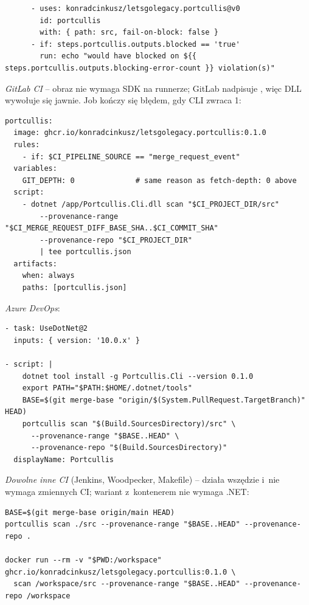 \begin{lstlisting}
      - uses: konradcinkusz/letsgolegacy.portcullis@v0
        id: portcullis
        with: { path: src, fail-on-block: false }
      - if: steps.portcullis.outputs.blocked == 'true'
        run: echo "would have blocked on ${{ steps.portcullis.outputs.blocking-error-count }} violation(s)"
\end{lstlisting}

\emph{GitLab CI} -- obraz nie wymaga SDK na runnerze; GitLab nadpisuje
, więc DLL wywołuje się jawnie. Job kończy się błędem, gdy CLI zwraca 1:

\begin{lstlisting}
portcullis:
  image: ghcr.io/konradcinkusz/letsgolegacy.portcullis:0.1.0
  rules:
    - if: $CI_PIPELINE_SOURCE == "merge_request_event"
  variables:
    GIT_DEPTH: 0              # same reason as fetch-depth: 0 above
  script:
    - dotnet /app/Portcullis.Cli.dll scan "$CI_PROJECT_DIR/src"
        --provenance-range "$CI_MERGE_REQUEST_DIFF_BASE_SHA..$CI_COMMIT_SHA"
        --provenance-repo "$CI_PROJECT_DIR"
        | tee portcullis.json
  artifacts:
    when: always
    paths: [portcullis.json]
\end{lstlisting}

\emph{Azure DevOps}:

\begin{lstlisting}
- task: UseDotNet@2
  inputs: { version: '10.0.x' }

- script: |
    dotnet tool install -g Portcullis.Cli --version 0.1.0
    export PATH="$PATH:$HOME/.dotnet/tools"
    BASE=$(git merge-base "origin/$(System.PullRequest.TargetBranch)" HEAD)
    portcullis scan "$(Build.SourcesDirectory)/src" \
      --provenance-range "$BASE..HEAD" \
      --provenance-repo "$(Build.SourcesDirectory)"
  displayName: Portcullis
\end{lstlisting}

\emph{Dowolne inne CI} (Jenkins, Woodpecker, Makefile) --  działa
wszędzie i~nie wymaga zmiennych CI; wariant z~kontenerem nie wymaga .NET:

\begin{lstlisting}
BASE=$(git merge-base origin/main HEAD)
portcullis scan ./src --provenance-range "$BASE..HEAD" --provenance-repo .

docker run --rm -v "$PWD:/workspace" ghcr.io/konradcinkusz/letsgolegacy.portcullis:0.1.0 \
  scan /workspace/src --provenance-range "$BASE..HEAD" --provenance-repo /workspace
\end{lstlisting}


